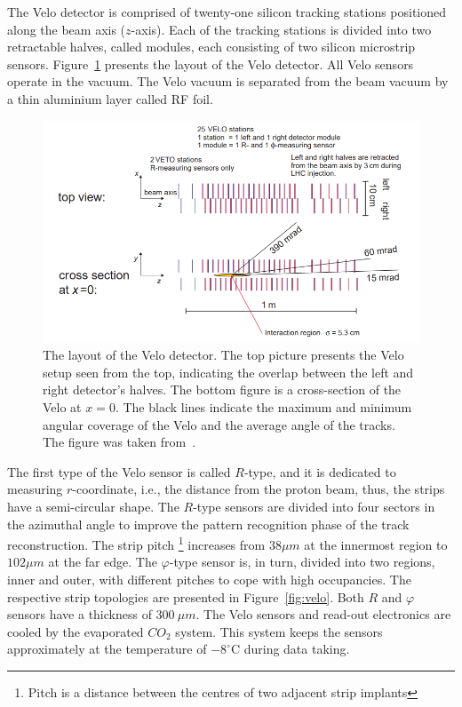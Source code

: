 The Velo detector is comprised of twenty-one silicon tracking stations positioned along the beam axis ($z$-axis). Each of the tracking stations is divided into two retractable halves, called modules, each consisting of two silicon microstrip sensors. Figure~\ref{fig:veloLayout} presents the layout of the Velo detector. All Velo sensors operate in the vacuum. The Velo vacuum is separated from the beam vacuum by a thin aluminium layer called RF foil.

\begin{figure}[h]
\centering
\includegraphics{figures/VeloLayout.png}
\caption{The layout of the Velo detector. The top picture presents the Velo setup seen from the top, indicating the overlap between the left and right detector's halves. The bottom figure is a cross-section of the Velo at $x=0$. The black lines indicate the maximum and minimum angular coverage of the Velo and the average angle of the tracks. The figure was taken from~\cite{VELO}. 
\label{fig:veloLayout}}
\end{figure}

The first type of the Velo sensor is called $R$-type, and it is dedicated to measuring $r$-coordinate, i.e., the distance from the proton beam, thus, the strips have a semi-circular shape. The $R$-type sensors are divided into four sectors in the azimuthal angle to improve the pattern recognition phase of the track reconstruction. The strip pitch \footnote{Pitch is a distance between the centres of two adjacent strip implants} increases from $38\mu m$ at the innermost region to $102 \mu m$ at the far edge. The $\varphi$-type sensor is, in turn, divided into two regions, inner and outer, with different pitches to cope with high occupancies. The respective strip topologies are presented in Figure~\ref{fig:velo}. Both $R$ and $\varphi$ sensors have a thickness of $300~\mu m$. The Velo sensors and read-out electronics are cooled by the evaporated $CO_2$ system. This system keeps the sensors approximately at the temperature of $-8^\circ$C during data taking.  

